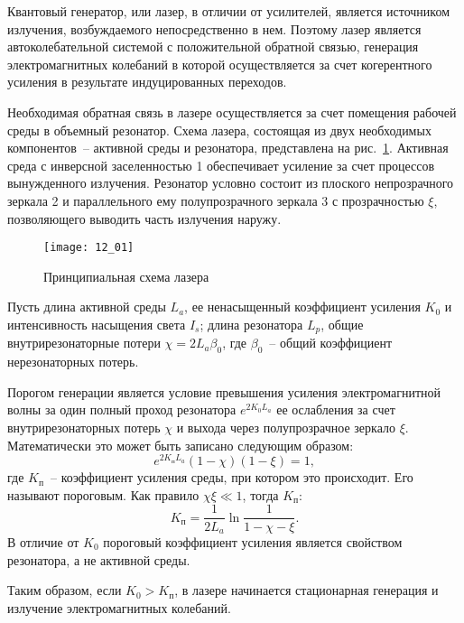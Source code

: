 
Квантовый генератор, или лазер, в отличии от усилителей, является источником
излучения, возбуждаемого непосредственно в нем. Поэтому лазер является
автоколебательной системой с положительной обратной связью, генерация
электромагнитных колебаний в которой осуществляется за счет когерентного
усиления в результате индуцированных переходов.

Необходимая обратная связь в лазере осуществляется за счет помещения рабочей
среды в объемный резонатор. Схема лазера, состоящая из двух необходимых
компонентов~-- активной среды и резонатора, представлена на рис.~\ref{pic12.1}.
Активная среда с инверсной заселенностью 1 обеспечивает усиление за счет
процессов вынужденного излучения. Резонатор условно состоит из плоского
непрозрачного зеркала 2 и параллельного ему полупрозрачного зеркала 3 с
прозрачностью \( \xi \), позволяющего выводить часть излучения наружу.

\begin{figure}[h!]
  \center
  \texttt{[image: 12\_01]}
  \caption{Принципиальная схема лазера}
  \label{pic12.1}
\end{figure}

Пусть длина активной среды \( L_a \), ее ненасыщенный коэффициент усиления
\( K_0 \) и интенсивность насыщения света \( I_s \); длина резонатора \( L_p \),
общие внутрирезонаторные потери \( \chi = 2L_a\beta_0 \), где \( \beta_0 \)~--
общий коэффициент нерезонаторных потерь.

Порогом генерации является условие превышения усиления электромагнитной волны за
один полный проход резонатора \( e^{2K_0 L_a} \) ее ослабления за счет
внутрирезонаторных потерь \( \chi \) и выхода через полупрозрачное зеркало
\( \xi \). Математически это может быть записано следующим образом:
\[
  e^{2K_\text{п} L_a}(1 - \chi)(1 - \xi) = 1,
\]
где \( K_\text{п} \)~-- коэффициент усиления среды, при котором это происходит.
Его называют пороговым. Как правило \( \chi\xi \ll 1 \), тогда \( K_\text{п} \):
\begin{equation}
  K_\text{п} = \frac{1}{2L_a}\ln\frac{1}{1 - \chi - \xi}.
  \label{eq12.1}
\end{equation}
В отличие от \( K_0 \) пороговый коэффициент усиления является свойством
резонатора, а не активной среды.

Таким образом, если \( K_0 > K_\text{п} \), в лазере начинается стационарная
генерация и излучение электромагнитных колебаний.
